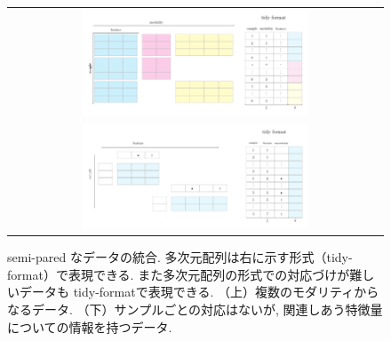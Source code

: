 \documentclass[a4paper,12ptc]{jsarticle} %
\begin{document}
\begin{figure}
    \centering
    \begin{tabular}{c}
    \includegraphics[width=0.62\textwidth]{img/mosaic_mm.pdf} \\
    \includegraphics[width=0.62\textwidth]{img/mosaic_an.pdf} 
    \end{tabular}
    \caption{semi-pared なデータの統合. 多次元配列は右に示す形式（tidy-format）で表現できる.  また多次元配列の形式での対応づけが難しいデータも tidy-formatで表現できる. （上）複数のモダリティからなるデータ. （下）サンプルごとの対応はないが, 関連しあう特徴量についての情報を持つデータ.}
    \label{fig_mosaic}
\end{figure}
\end{document}
